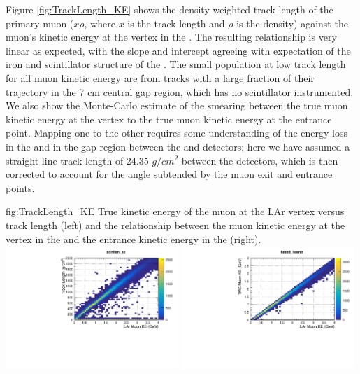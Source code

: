 Figure \ref{fig:TrackLength_KE} shows the density-weighted track length of the primary muon ($x\rho$, where $x$ is the track length and $\rho$ is the density) against the muon's kinetic energy at the vertex in the . The resulting relationship is very linear as expected, with the slope and intercept agreeing with expectation of the iron and scintillator structure of the . The small population at low track length for all muon kinetic energy are from tracks with a large fraction of their trajectory in the 7 cm central gap region, which has no scintillator instrumented. We also show the Monte-Carlo estimate of the smearing between the true muon kinetic energy at the  vertex to the true muon kinetic energy at the  entrance point. Mapping one to the other requires some understanding of the energy loss in the  and in the gap region between the  and  detectors; here we have assumed a straight-line track length of 24.35 $g/cm^{2}$ between the detectors, which is then corrected to account for the angle subtended by the muon  exit and  entrance points. 

\begin{dunefigure}{fig:TrackLength_KE}
{True kinetic energy of the muon at the LAr vertex versus track length (left) and the relationship between the muon kinetic energy at the vertex in the  and the entrance kinetic energy in the  (right).}
\includegraphics[width=0.49\textwidth, clip, trim={0mm 0mm 0mm 10mm}]{graphics/tms/Simulation/KE_est/track_length_LArKE.pdf}
\includegraphics[width=0.49\textwidth, clip, trim={0mm 0mm 0mm 10mm}]{graphics/tms/Simulation/KE_est/LArKE_TMSKE.pdf}
\end{dunefigure}

